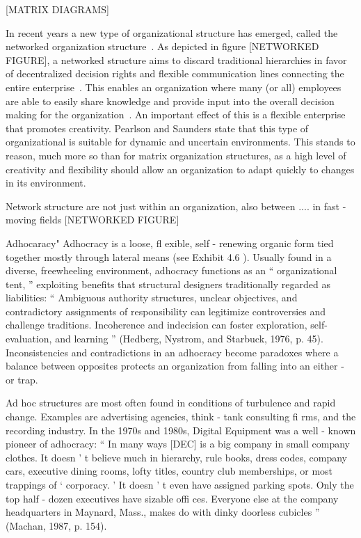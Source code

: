 [MATRIX DIAGRAMS]

In recent years a new type of organizational structure has emerged, called the networked organization structure~\cite{pearlson2009}. As depicted in figure [NETWORKED FIGURE], a networked structure aims to discard traditional hierarchies in favor of decentralized decision rights and flexible communication lines connecting the entire enterprise~\cite{applegate1988,pearlson2009}. This enables an organization where many (or all) employees are able to easily share knowledge and provide input into the overall decision making for the organization~\cite{pearlson2009}. An important effect of this is a flexible enterprise that promotes creativity. Pearlson and Saunders state that this type of organizational is suitable for dynamic and uncertain environments. This stands to reason, much more so than for matrix  organization structures, as a high level of creativity and flexibility should allow an organization to adapt quickly to changes in its environment. 

Network structure are not just within an organization, also between \cite{Bolman2008} .... in fast - moving fields
[NETWORKED FIGURE]

Adhocaracy\cite{Bolman2008}"
Adhocracy is a loose, fl exible, self - renewing organic form tied together mostly through lateral means (see Exhibit 4.6 ). Usually found in a diverse, freewheeling environment, adhocracy functions as an “ organizational tent, ” exploiting benefits that structural designers traditionally regarded as liabilities: “ Ambiguous authority structures, unclear objectives, and contradictory assignments of responsibility can legitimize controversies and challenge traditions. Incoherence and indecision can foster exploration, self- evaluation, and learning ” (Hedberg, Nystrom, and Starbuck, 1976, p. 45). Inconsistencies and contradictions in an adhocracy become paradoxes where a balance between opposites protects an organization from falling into an either - or trap.

Ad hoc structures are most often found in conditions of turbulence and rapid change. Examples are advertising agencies, think - tank consulting fi rms, and the recording industry. In the 1970s and 1980s, Digital Equipment was a well - known pioneer of adhocracy: “ In many ways [DEC] is a big company in small company clothes. It doesn ’ t believe much in hierarchy, rule books, dress codes, company cars, executive dining rooms, lofty titles, country club memberships, or most trappings of ‘ corporacy. ’ It doesn ’ t even have assigned parking spots. Only the top half - dozen executives have sizable offi ces. Everyone else at the company headquarters in Maynard, Mass., makes do with dinky doorless cubicles ” (Machan, 1987, p. 154).

